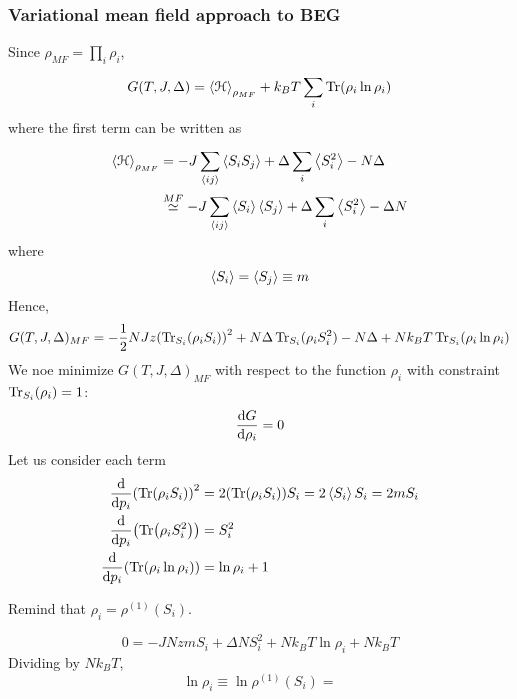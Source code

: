 \documentclass[../main/main.tex]{subfiles}
\begin{document}
\subsubsection{Variational mean field approach to BEG}
Since \( \rho _{MF} = \prod_{i}^{} \rho _i   \),
\begin{equation}
  G(T,J,\Delta ) = \expval{\mathcal{H}}_{\rho _{MF}} + k_B T \sum_{i}^{} \Tr(\rho _i \ln{\rho _i } )
\end{equation}
where the first term can be written as
\begin{equation}
\begin{split}
\expval{\mathcal{H}}_{\rho _{MF}}   &= - J \sum_{\expval{ij} }^{} \expval{S_i S_j}  + \Delta \sum_{i}^{} \expval{S_i^2} - N \Delta      \\
& \overset{MF}{\simeq } - J \sum_{\expval{ij} }^{} \expval{S_i} \expval{S_j} + \Delta \sum_{i}^{} \expval{S_i^2} - \Delta N
\end{split}
\end{equation}
where
\begin{equation}
  \expval{S_i} = \expval{S_j} \equiv m
\end{equation}
Hence,
\begin{equation}
  G(T,J, \Delta )_{MF}  = - \frac{1}{2} N J z \qty( \Tr_{S_i}(\rho _i S_i) )^2
  + N \Delta \Tr_{S_i}(\rho _i S_i^2) - N \Delta +
  N k_B T \Tr_{S_i}(\rho _i \ln{\rho _i} )
\end{equation}
We noe minimize \( G(T,J,\Delta )_{MF} \) with respect to the function \( \rho _i \) with constraint \( \Tr_{S_i}(\rho _i) = 1  \):
\begin{equation}
  \dv{G}{\rho _i} = 0
\end{equation}
Let us consider each term
\begin{subequations}
\begin{align}
  \dv{}{p_i} \qty(\Tr(\rho _i S_i) )^2& = 2 \qty(\Tr(\rho _i S_i) ) S_i = 2 \expval{S_i} S_i = 2 m S_i \\
    \dv{}{p_i} \qty(\Tr(\rho _i S_i^2) ) &= S_i^2 \\
      \dv{}{p_i} \qty(\Tr(\rho _i \ln{\rho _i} ) ) &=  \ln{\rho _i }  +1
\end{align}
\end{subequations}
\begin{remark} Remind that
\( \rho _i = \rho ^{(1)} (S_i) \).
\end{remark}
\begin{equation}
  0 = - J N z m S_i + \Delta N S_i^2 + N k_B T \ln{\rho _i} + N k_B T
\end{equation}
Dividing by \( N k_B T \),
\begin{equation}
  \ln{\rho _i} \equiv \ln{\rho ^{(1)} (S_i)} =   
\end{equation}
\end{document}
